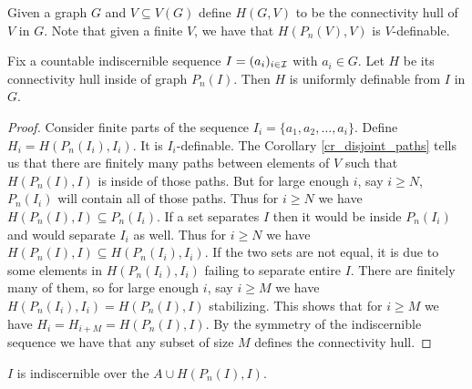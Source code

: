 \begin{Definition}
  Given a graph $G$ and $V \subseteq V(G)$ define $H(G, V)$ to be the connectivity hull of $V$ in $G$.
  Note that given a finite $V$, we have that $H(P_n(V), V)$ is $V$-definable.
\end{Definition}

\begin{Lemma} \label{lm_uniform}
  Fix a countable indiscernible sequence $I = (a_i)_{i \in \operatorname{\mathcal I}}$ with $a_i \in G$.
  Let $H$ be its connectivity hull inside of graph $P_n(I)$.
  Then $H$ is uniformly definable from $I$ in $G$.
\end{Lemma}


  

\begin{proof}%
  Consider finite parts of the sequence $I_i = \{a_1, a_2, \ldots, a_i\}$.
  Define $H_i = H(P_n(I_i), I_i)$.
  It is $I_i$-definable. %
  The Corollary \ref{cr_disjoint_paths} tells us that there are finitely many paths between elements of $V$ such that
  $H(P_n(I), I)$ is inside of those paths.
  But for large enough $i$, say $i \geq N$, $P_n(I_i)$ will contain all of those paths.
  Thus for $i \geq N$ we have $H(P_n(I), I) \subseteq P_n(I_i)$.
  If a set separates $I$ then it would be inside $P_n(I_i)$ and would separate $I_i$ as well.
  Thus for $i \geq N$ we have $H(P_n(I), I) \subseteq H(P_n(I_i), I_i)$.
  If the two sets are not equal, it is due to some elements in $H(P_n(I_i), I_i)$ failing to separate entire $I$.
  There are finitely many of them, so for large enough $i$, say $i \geq M$ we have $H(P_n(I_i), I_i) = H(P_n(I), I)$ stabilizing.
  This shows that for $i \geq M$ we have $H_i = H_{i+M} = H(P_n(I), I)$.
  By the symmetry of the indiscernible sequence we have that any subset of size $M$ defines the connectivity hull.
\end{proof}

\begin{Lemma} \label{cr_bump}
  $I$ is indiscernible over the $A \cup H(P_n(I), I)$.
\end{Lemma}

